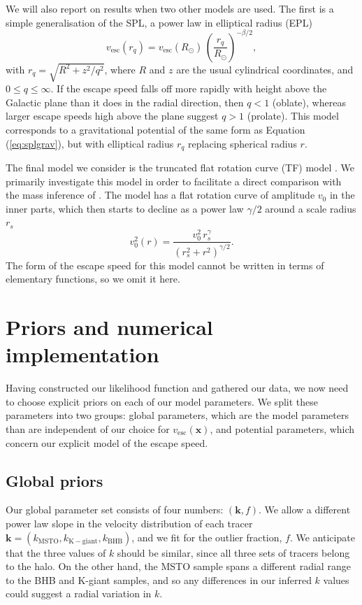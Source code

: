 \documentclass[useAMS,twocolumn,usenatbib]{mn2e}
\def\vesc{{v_\mathrm{esc}}}
\def\pos{{\boldsymbol{x}}}
\begin{document}
We will also report on results when two other models are used. The first is a simple 
generalisation of the SPL, a power law in elliptical radius (EPL)
%
\begin{equation}
\vesc(r_q) = \vesc(R_\odot)\,\left(\dfrac{r_q}{R_\odot}\right)^{-\beta/2},
\end{equation}
%
with $r_q = \sqrt{R^2 + z^2/q^2}$, where $R$ and $z$ are the usual cylindrical coordinates, 
and $0 \leq q \leq \infty$. If the escape speed 
falls off more rapidly with height above the Galactic plane than it does in the 
radial direction, then $q<1$ (oblate), whereas larger escape speeds high above the plane 
suggest $q>1$ (prolate). This model corresponds to a gravitational potential of 
the same form as Equation (\ref{eq:splgrav}), but with elliptical radius $r_q$ replacing 
spherical radius $r$. 

The final model we consider is the truncated flat rotation curve (TF) model \citep[see][]{Gi14,Wi99}. We primarily 
investigate this model in order to facilitate a direct comparison with the mass inference of \citet{Gi14}. 
The model has a flat rotation curve of amplitude $v_0$ in the inner parts, which then starts to decline 
as a power law $\gamma/2$ around a scale radius $r_s$
%
\begin{equation}
v_0^2(r) = \dfrac{v_0^2\,r_s^\gamma}{(r_s^2 + r^2)^{\gamma/2}}.
\end{equation}
%
The form of the escape speed for this model cannot be written in terms of elementary functions, so we 
omit it here. 

\section{Priors and numerical implementation}

Having constructed our likelihood function and gathered our data, we now 
need to choose explicit priors on each of our model parameters. We split 
these parameters into two groups: global parameters, which are the 
model parameters than are independent of our choice for $\vesc(\pos)$, and 
potential parameters, which concern our explicit model of the escape speed.

\subsection{Global priors}

Our global parameter set consists of four numbers: $(\boldsymbol{k},f)$. We 
allow a different power law slope in the velocity distribution of each tracer 
$\boldsymbol{k} = (k_\mathrm{MSTO},k_\mathrm{K-giant},k_\mathrm{BHB})$, 
and we fit for the outlier fraction, $f$. We anticipate that the three 
values of $k$ should be similar, since all three sets of tracers belong to the halo. 
On the other hand, the MSTO sample spans a different radial range to the BHB and K-giant 
samples, and so any differences in our inferred $k$ values could suggest a radial 
variation in $k$. 
\end{document}
